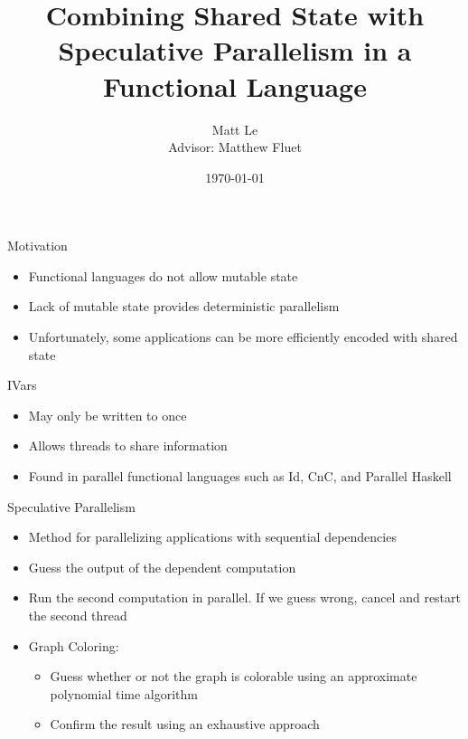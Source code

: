 \documentclass[mathserif]{beamer}
\newcommand{\bis}[1]{\begin{itemize}\setlength{\itemsep}{#1}}
\begin{document}
\title[RPA]{Combining Shared State with Speculative Parallelism in a Functional Language}

\author[Matt Le]{Matt Le \\ Advisor: Matthew Fluet}

\date{\today} %

\begin{frame}
\titlepage
\end{frame}


\begin{frame}{Motivation}
\bis{.5cm}
\item Functional languages do not allow mutable state
\item Lack of mutable state provides deterministic parallelism
\item Unfortunately, some applications can be more efficiently encoded with shared state
\end{itemize}
\end{frame}

\begin{frame}{IVars}
\bis{.5cm}
\item May only be written to once
\item Allows threads to share information
\item Found in parallel functional languages such as Id, CnC, and Parallel Haskell
\end{itemize}
\end{frame}

\begin{frame}[fragile]{Speculative Parallelism}
\bis{.5cm}
\item Method for parallelizing applications with sequential dependencies
\item Guess the output of the dependent computation
\item Run the second computation in parallel.  If we guess wrong, cancel and restart the second thread
\item Graph Coloring:
\begin{itemize}
\item Guess whether or not the graph is colorable using an approximate polynomial time algorithm
\item Confirm the result using an exhaustive approach
\end{itemize}

\end{itemize}


\end{frame}
\end{document}
